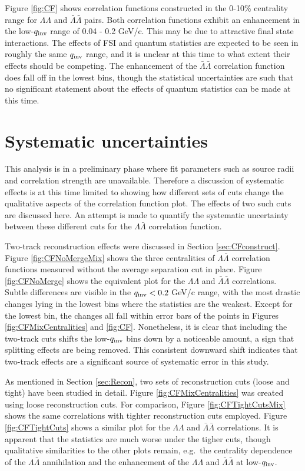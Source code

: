 Figure \ref{fig:CF} shows correlation functions constructed in the 0-10\% centrality range for $\Lambda\Lambda$ and $\bar{\Lambda}\bar{\Lambda}$ pairs.  Both correlation functions exhibit an enhancement in the low-$q_{\rm inv}$ range of 0.04 - 0.2 GeV/c.  This may be due to attractive final state interactions.  The effects of FSI and quantum statistics are expected to be seen in roughly the same $q_{\rm inv}$ range, and it is unclear at this time to what extent their effects should be competing. The enhancement of the $\bar{\Lambda}\bar{\Lambda}$ correlation function does fall off in the lowest bins, though the statistical uncertainties are such that no significant statement about the effects of quantum statistics can be made at this time.

\section{Systematic uncertainties}
\label{sec:Systematics}

This analysis is in a preliminary phase where fit parameters such as source radii and correlation strength are unavailable.  Therefore a discussion of systematic effects is at this time limited to showing how different sets of cuts change the qualitative aspects of the correlation function plot.  The effects of two such cuts are discussed here.  An attempt is made to quantify the systematic uncertainty between these different cuts for the $\Lambda\bar{\Lambda}$ correlation function.

Two-track reconstruction effects were discussed in Section \ref{sec:CFconstruct}. Figure \ref{fig:CFNoMergeMix} shows the three centralities of $\Lambda\bar{\Lambda}$ correlation functions measured without the average separation cut in place.  Figure \ref{fig:CFNoMerge} shows the equivalent plot for the $\Lambda\Lambda$ and $\bar{\Lambda}\bar{\Lambda}$ correlations. Subtle differences are visible in the $q_{\rm inv} < 0.2$ GeV/c range, with the most drastic changes lying in the lowest bins where the statistics are the weakest.  Except for the lowest bin, the changes all fall within error bars of the points in Figures \ref{fig:CFMixCentralities} and \ref{fig:CF}.  Nonetheless, it is clear that including the two-track cuts  shifts the low-$q_{\rm inv}$ bins down by a noticeable amount, a sign that splitting effects are being removed.  This consistent downward shift indicates that two-track effects are a significant source of systematic error in this study.

As mentioned in Section \ref{sec:Recon}, two sets of reconstruction cuts (loose and tight) have been studied in detail.  Figure \ref{fig:CFMixCentralities} was created using loose reconstruction cuts.  For comparison, Figure \ref{fig:CFTightCutsMix} shows the same correlations with tighter reconstruction cuts employed.  Figure \ref{fig:CFTightCuts} shows a similar plot for the $\Lambda\Lambda$ and $\bar{\Lambda}\bar{\Lambda}$ correlations.  It is apparent that the statistics are much worse under the tigher cuts, though qualitative similarities to the other plots remain, e.g.\ the centrality dependence of the $\Lambda\bar{\Lambda}$ annihilation and the enhancement of the $\Lambda\Lambda$ and $\bar{\Lambda}\bar{\Lambda}$ at low-$q_{\rm inv}$.

